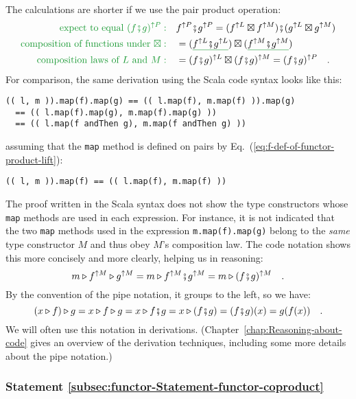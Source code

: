 The calculations are shorter if we use the pair product operation:
\begin{align*}
{\color{greenunder}\text{expect to equal }(f\bef g)^{\uparrow P}:}\quad & f^{\uparrow P}\bef g^{\uparrow P}=(f^{\uparrow L}\boxtimes f^{\uparrow M})\bef(g^{\uparrow L}\boxtimes g^{\uparrow M})\\
{\color{greenunder}\text{composition of functions under }\boxtimes:}\quad & =(\gunderline{f^{\uparrow L}\bef g^{\uparrow L}})\boxtimes(\gunderline{f^{\uparrow M}\bef g^{\uparrow M}})\\
{\color{greenunder}\text{composition laws of }L\text{ and }M:}\quad & =(f\bef g)^{\uparrow L}\boxtimes(f\bef g)^{\uparrow M}=(f\bef g)^{\uparrow P}\quad.
\end{align*}
For comparison, the same derivation using the Scala code syntax looks
like this:
\begin{lstlisting}
(( l, m )).map(f).map(g) == (( l.map(f), m.map(f) )).map(g)
  == (( l.map(f).map(g), m.map(f).map(g) ))
  == (( l.map(f andThen g), m.map(f andThen g) )) 
\end{lstlisting}
assuming that the \lstinline!map! method is defined on pairs by Eq.~(\ref{eq:f-def-of-functor-product-lift}):
\begin{lstlisting}
(( l, m )).map(f) == (( l.map(f), m.map(f) ))
\end{lstlisting}
The proof written in the Scala syntax does not show the type constructors
whose \lstinline!map! methods are used in each expression. For instance,
it is not indicated that the two \lstinline!map! methods used in
the expression \lstinline!m.map(f).map(g)! belong to the \emph{same}
type constructor $M$ and thus obey $M$\textsf{'}s composition law. The code
notation shows this more concisely and more clearly, helping us in
reasoning:
\[
m\triangleright f^{\uparrow M}\triangleright g^{\uparrow M}=m\triangleright f^{\uparrow M}\bef g^{\uparrow M}=m\triangleright(f\bef g)^{\uparrow M}\quad.
\]
By the convention of the pipe notation, it groups to the left, so
we have:
\[
\left(x\triangleright f\right)\triangleright g=x\triangleright f\triangleright g=x\triangleright f\bef g=x\triangleright(f\bef g)=(f\bef g)(x)=g(f(x))\quad.
\]
We will often use this notation in derivations. (Chapter~\ref{chap:Reasoning-about-code}
gives an overview of the derivation techniques, including some more
details about the pipe notation.)

\subsubsection{Statement \label{subsec:functor-Statement-functor-coproduct}\ref{subsec:functor-Statement-functor-coproduct}}

